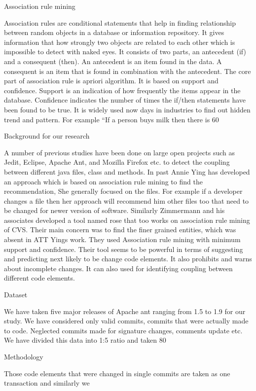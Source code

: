 Association rule mining

Association rules are conditional statements that help in finding relationship between random objects in a database or information repository. It gives information that how strongly two objects are related to each other which is impossible to detect with naked eyes.
It consists of two parts, an antecedent (if) and a consequent (then).  An antecedent is an item found in the data. A consequent is an item that is found in combination with the antecedent.
The core part of association rule is apriori algorithm. It is based on support and confidence. Support is an indication of how frequently the items appear in the database. Confidence indicates the number of times the if/then statements have been found to be true.
It is widely used now days in industries to find out hidden trend and pattern. 
For example “If a person buys milk then there is 60%

Background for our research

A number of previous studies have been done on large open projects such as Jedit, Eclipse, Apache Ant, and Mozilla Firefox etc. to detect the coupling between different java files, class and methods. In past Annie Ying has developed an approach which is based on association rule mining to find the recommendation, She generally focused on the files. For example if a developer changes a file then her approach will recommend him other files too that need to be changed for newer version of software. Similarly Zimmermann and his associates developed a tool named rose that too works on association rule mining of CVS. Their main concern was to find the finer grained entities, which was absent in ATT Yings work. They used Association rule mining with minimum support and confidence. Their tool seems to be powerful in terms of suggesting and predicting next likely to be change code elements. It also prohibits and warns about incomplete changes. It can also used for identifying coupling between different code elements.

Dataset

We have taken five major releases of Apache ant ranging from 1.5 to 1.9 for our study. We have considered only valid commits, commits that were actually made to code. Neglected commits made for signature changes, comments update etc. We have divided this data into 1:5 ratio and taken 80%

Methodology

Those code elements that were changed in single commits are taken as one transaction and similarly we 



